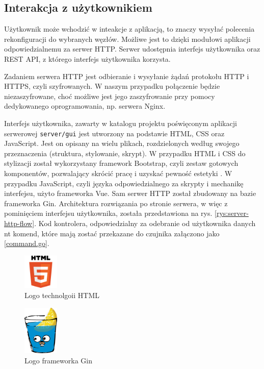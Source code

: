 \documentclass[12pt,oneside,a4paper]{book}
\theoremstyle{break}
\begin{document}
\subsection{Interakcja z użytkownikiem}
Użytkownik może wchodzić w inteakcje z aplikacją, to znaczy wysyłać polecenia
rekonfiguracji do wybranych węzłów. Możliwe jest to dzięki modułowi aplikacji
odpowiedzialnemu za serwer HTTP. Serwer udostępnia interfejs użytkownika
oraz REST API, z którego interfejs użytkownika korzysta. 
\par Zadaniem serwera HTTP jest odbieranie i wysyłanie żądań 
protokołu HTTP i HTTPS, czyli szyfrowanych. W naszym 
przypadku połączenie będzie 
niezaszyfrowane, choć możliwe jest jego zaszyfrowanie przy pomocy
dedykowanego oprogramowania, np. serwera Nginx. 
\cite{wikipedia:web-server} \cite{nginx-tls}
\par Interfejs użytkownika, zawarty w katalogu projektu poświęconym aplikacji
serwerowej \texttt{server/gui}
jest utworzony na podstawie HTML, CSS oraz
JavaScript. Jest on opisany na wielu plikach, rozdzielonych 
według swojego przeznaczenia (struktura, stylowanie, skrypt). 
W przypadku HTML i CSS do stylizacji został wykorzystany
framework Bootstrap, czyli zestaw gotowych komponentów, pozwalający
skrócić pracę i uzyskać pewność estetyki \cite{bootstrap}.
 W przypadku JavaScript, czyli
języka odpowiedzialnego za skrypty i mechanikę interfejsu, użyto
frameworka Vue. \cite{vue} Sam serwer HTTP został zbudowany na
bazie frameworka Gin. \cite{gin} Architektura rozwiązania po stronie
serwera, w więc z pominięciem interfejsu użytkownika, została
przedstawiona na rys. \ref{rys:server-http-flow}.
Kod kontrolera, odpowiedzialny za odebranie
od użytkownika danych nt komend, które
mają zostać przekazane do czujnika załączono
jako \ref*{command.go}.

\begin{figure}[H]
    \begin{center}
        \includegraphics[width=0.15\textwidth]{logo_html.png}        
        \caption{Logo technolgoii HTML}        
        \label{rys:logo-html}
    \end{center}
\end{figure}

\begin{figure}[H]
    \begin{center}
        \includegraphics[width=0.15\textwidth]{logo_gin.png}        
        \caption{Logo frameworka Gin}        
        \label{rys:logo-gin}
    \end{center}
\end{figure}
\end{document}
